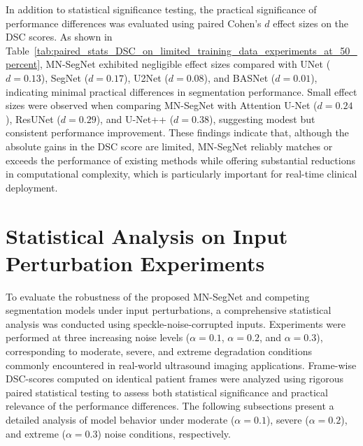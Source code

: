 \documentclass[12pt,letterpaper]{article}
\begin{document}
In addition to statistical significance testing, the practical significance of performance differences was evaluated using paired Cohen’s $d$ effect sizes on the DSC scores.  As shown in Table~\ref{tab:paired_stats_DSC_on_limited_training_data_experiments_at_50_percent}, MN-SegNet exhibited negligible effect sizes compared with UNet ($d = 0.13$), SegNet ($d = 0.17$), U2Net ($d = 0.08$), and BASNet ($d = 0.01$), indicating minimal practical differences in segmentation performance. Small effect sizes were observed when comparing MN-SegNet with Attention U-Net ($d = 0.24$), ResUNet ($d = 0.29$), and U-Net++ ($d = 0.38$), suggesting modest but consistent performance improvement. These findings indicate that, although the absolute gains in the DSC score are limited, MN-SegNet reliably matches or exceeds the performance of existing methods while offering substantial reductions in computational complexity, which is particularly important for real-time clinical deployment.







\section{Statistical Analysis on Input Perturbation Experiments}





To evaluate the robustness of the proposed MN-SegNet and competing segmentation
models under input perturbations, a comprehensive statistical analysis was
conducted using speckle-noise-corrupted inputs. Experiments were performed at
three increasing noise levels ($\alpha = 0.1$, $\alpha = 0.2$, and $\alpha = 0.3$),
corresponding to moderate, severe, and extreme degradation conditions commonly
encountered in real-world ultrasound imaging applications. Frame-wise DSC-scores
computed on identical patient frames were analyzed using rigorous paired
statistical testing to assess both statistical significance and practical
relevance of the performance differences. The following subsections present a
detailed analysis of model behavior under moderate ($\alpha = 0.1$), severe
($\alpha = 0.2$), and extreme ($\alpha = 0.3$) noise conditions, respectively.
\end{document}
